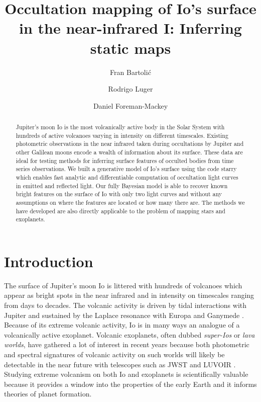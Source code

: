\documentclass[modern]{aastex62}
\begin{document}
\title{Occultation mapping of Io's surface in the near-infrared I: Inferring static maps} 

\author{Fran Bartoli\'c}
\author{Rodrigo Luger}
\author{Daniel Foreman-Mackey}
%

\begin{abstract}
Jupiter's moon Io is the most volcanically active body in the Solar System with hundreds of active volcanoes varying in intensity on different timescales.
Existing photometric observations in the near infrared taken during occultations by Jupiter and other Galilean moons encode a wealth of information about its surface.
These data are ideal for testing methods for inferring surface features of occulted bodies from time series observations.
We built a generative model of Io's surface using the code starry \href{https://rodluger.github.io/starry/}{\color{linkcolor}\faGithub} which enables fast analytic and differentiable computation of occultation light curves in emitted and reflected light.
    Our fully Bayesian model is able to recover known bright features on the surface of Io with only two light curves and without any assumptions on where the features are located or how many there are.
    The methods we have developed are also directly applicable to the problem of mapping stars and exoplanets.\href{https://github.com/fbartolic/volcano}{\color{linkcolor}\faGithub}
\end{abstract}

%
\section{Introduction}
The surface of Jupiter's moon Io is littered with hundreds of volcanoes which appear as bright spots in the near infrared and in intensity on timescales ranging from days to decades.
The volcanic activity is driven by tidal interactions with Jupiter and sustained by the Laplace resonance with Europa and Ganymede \citep{peale1979}.
Because of its extreme volcanic activity, Io is in many ways an analogue of a volcanically active exoplanet.
Volcanic exoplanets, often dubbed \emph{super-Ios} or \emph{lava worlds}, have gathered a lot of interest in recent years because both photometric and spectral signatures of volcanic activity on such worlds will likely be detectable in the near future with telescopes such as JWST and LUVOIR \citep{kaltenegger2010,henning2018,oza2019}.
Studying extreme volcanism on both Io and exoplanets is scientifically valuable because it provides a window into the properties of the early Earth and it informs theories of planet formation.
\end{document}
